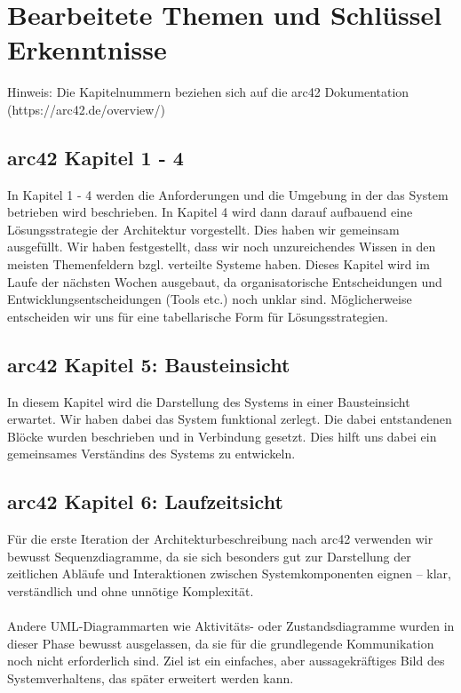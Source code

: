\documentclass{article}
\begin{document}
\section{Bearbeitete Themen und Schlüssel Erkenntnisse}
Hinweis: Die Kapitelnummern beziehen sich auf die arc42 Dokumentation (https://arc42.de/overview/)

\subsection{arc42 Kapitel 1 - 4}
In Kapitel 1 - 4 werden die Anforderungen und die Umgebung in der das System betrieben wird beschrieben. In Kapitel 4 wird dann darauf aufbauend eine Lösungsstrategie der Architektur vorgestellt. Dies haben wir gemeinsam ausgefüllt. Wir haben festgestellt, dass wir noch unzureichendes Wissen in den meisten Themenfeldern bzgl. verteilte Systeme haben. Dieses Kapitel wird im Laufe der nächsten Wochen ausgebaut, da organisatorische Entscheidungen und Entwicklungsentscheidungen (Tools etc.) noch unklar sind. Möglicherweise entscheiden wir uns für eine tabellarische Form für Lösungsstrategien.

\subsection{arc42 Kapitel 5: Bausteinsicht}
In diesem Kapitel wird die Darstellung des Systems in einer Bausteinsicht erwartet. Wir haben dabei das System funktional zerlegt. Die dabei entstandenen Blöcke wurden beschrieben und in Verbindung gesetzt. Dies hilft uns dabei ein gemeinsames Verständins des Systems zu entwickeln. 

\subsection{arc42 Kapitel 6: Laufzeitsicht}
Für die erste Iteration der Architekturbeschreibung nach arc42 verwenden wir bewusst Sequenzdiagramme, da sie sich besonders gut zur Darstellung der zeitlichen Abläufe und Interaktionen zwischen Systemkomponenten eignen – klar, verständlich und ohne unnötige Komplexität.\\\\
Andere UML-Diagrammarten wie Aktivitäts- oder Zustandsdiagramme wurden in dieser Phase bewusst ausgelassen, da sie für die grundlegende Kommunikation noch nicht erforderlich sind. Ziel ist ein einfaches, aber aussagekräftiges Bild des Systemverhaltens, das später erweitert werden kann.
\end{document}
